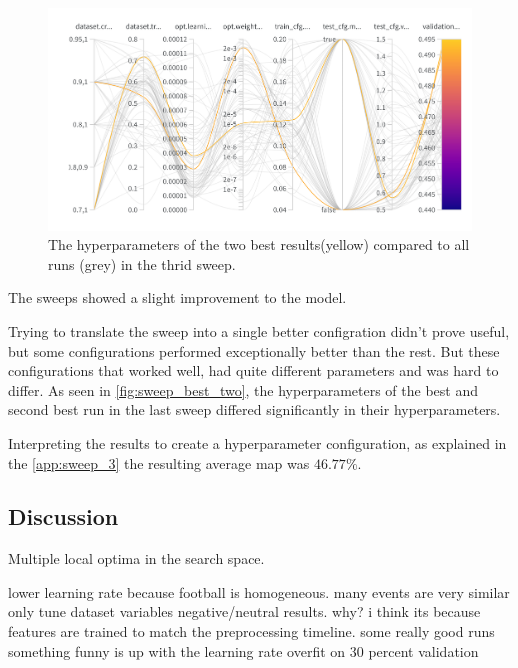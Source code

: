 \begin{figure}
    \centering
    \includegraphics[width=1\linewidth]{figures/sweep_two_best.png}
    \caption{The hyperparameters of the two best results(yellow) compared to all runs (grey) in the thrid sweep. }
    \label{fig:sweep_best_two}
\end{figure}

The sweeps showed a slight improvement to the model. 

Trying to translate the sweep into a single better configration didn't prove useful, but some configurations performed exceptionally better than the rest. But these configurations that worked well, had quite different parameters and was hard to differ. As seen in \autoref{fig:sweep_best_two}, the hyperparameters of the best and second best run in the last sweep differed significantly in their hyperparameters. 

Interpreting the results to create a hyperparameter configuration, as explained in the \autoref{app:sweep_3} the resulting average \acrshort{map} was \(46.77\%\). 

\subsection{Discussion}
\label{ssec:ex4_discussion}

Multiple local optima in the search space. 


lower learning rate because football is homogeneous. many events are very similar
only tune dataset variables
negative/neutral results. why? i think its because features are trained to match the preprocessing timeline. some really good runs
something funny is up with the learning rate
overfit on 30 percent validation



